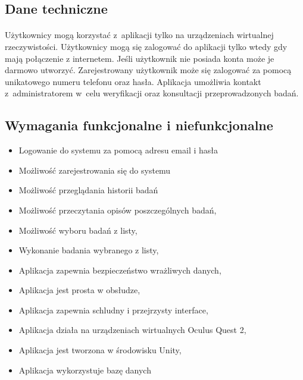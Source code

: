 \documentclass[12pt, letterpaper]{article}
\begin{document}
\subsection{Dane techniczne}
\paragraph{}	
Użytkownicy mogą korzystać z~aplikacji tylko na urządzeniach wirtualnej rzeczywistości. Użytkownicy mogą się zalogować do aplikacji tylko wtedy gdy mają połączenie z internetem. Jeśli użytkownik nie posiada konta może je darmowo utworzyć. Zarejestrowany użytkownik może się zalogować za pomocą unikatowego numeru telefonu oraz hasła. Aplikacja umożliwia kontakt z~administratorem w~celu weryfikacji oraz konsultacji przeprowadzonych badań.
	
\newpage		
\subsection{Wymagania funkcjonalne i niefunkcjonalne}

		
			\begin{itemize}
				\item Logowanie do systemu za pomocą adresu email i hasła
				\item Możliwość zarejestrowania się do systemu
				\item Możliwość przeglądania historii badań
				\item Możliwość przeczytania opisów poszczególnych badań,
				\item Możliwość wyboru badań z listy,
				\item Wykonanie badania wybranego z listy,
			\end{itemize}
			
		
			\begin{itemize}
				\item Aplikacja zapewnia bezpieczeństwo wrażliwych danych,
				\item Aplikacja jest prosta w obsłudze,
				\item Aplikacja zapewnia schludny i przejrzysty interface,
				\item Aplikacja działa na urządzeniach wirtualnych Oculus Quest 2,
				\item Aplikacja jest tworzona w środowisku Unity,
				\item Aplikacja wykorzystuje bazę danych
			\end{itemize}
			
\end{document}
